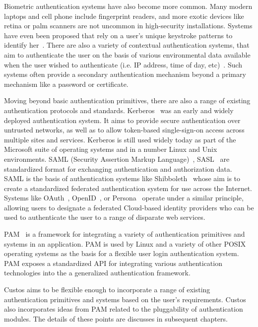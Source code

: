 Biometric authentication systems have also become more common. Many
modern laptops and cell phone include fingerprint readers, and more
exotic devices like retina or palm scanners are not uncommon in
high-security installations. Systems have even been proposed that rely
on a user's unique keystroke patterns to identify
her~\cite{Peacock2004}. There are also a variety of contextual
authentication systems, that aim to authenticate the user on the basis
of various environmental data available when the user wished to
authenticate (i.e. IP address, time of day,
etc)~\cite{Hulsebosch2005}. Such systems often provide a secondary
authentication mechanism beyond a primary mechanism like a password or
certificate.

Moving beyond basic authentication primitives, there are also a range
of existing authentication protocols and
standards. Kerberos~\cite{Kohl1994, Neuman1994} was an early and
widely deployed authentication system. It aims to provide secure
authentication over untrusted networks, as well as to allow
token-based single-sign-on access across multiple sites and
services. Kerberos is still used widely today as part of the Microsoft
suite of operating systems and in a number Linux and Unix
environments. SAML (Security Assertion Markup Language)~\cite{saml},
SASL~\cite{sasl} are standardized format for exchanging authentication
and authorization data. SAML is the basis of authentication systems
like Shibboleth~\cite{shibboleth, Leandro2012} whose aim is to create
a standardized federated authentication system for use across the
Internet. Systems like OAuth~\cite{oauth}, OpenID~\cite{openid}, or
Persona~\cite{persona} operate under a similar principle, allowing
users to designate a federated Cloud-based identity providers who can
be used to authenticate the user to a range of disparate web services.

PAM~\cite{linux-pam, openpam} is a framework for integrating a variety
of authentication primitives and systems in an application. PAM is
used by Linux and a variety of other POSIX operating systems as the
basis for a flexible user login authentication system. PAM exposes a
standardized API for integrating various authentication technologies
into the a generalized authentication framework.

Custos aims to be flexible enough to incorporate a range of existing
authentication primitives and systems based on the user's
requirements. Custos also incorporates ideas from PAM related to the
pluggability of authentication modules. The details of these points
are discusses in subsequent chapters.

